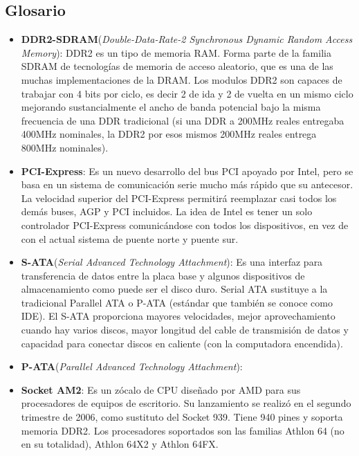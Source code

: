 \subsection{Glosario}

\begin{itemize}
\item \textbf{DDR2-SDRAM}(\textit{Double-Data-Rate-2 Synchronous Dynamic Random Access
Memory}): DDR2 es un tipo de memoria RAM. Forma parte de la familia SDRAM de
tecnologías de memoria de acceso aleatorio, que es una de las muchas
implementaciones de la DRAM. Los modulos DDR2 son capaces de trabajar con 4 bits
por ciclo, es decir 2 de ida y 2 de vuelta en un mismo ciclo mejorando
sustancialmente el ancho de banda potencial bajo la misma frecuencia de una DDR
tradicional (si una DDR a 200MHz reales entregaba 400MHz nominales, la DDR2 por
esos mismos 200MHz reales entrega 800MHz nominales).

\item \textbf{PCI-Express}: Es un nuevo desarrollo del bus PCI apoyado por
Intel, pero se basa en un sistema de comunicación serie mucho más rápido que su
antecesor. La velocidad superior del PCI-Express permitirá reemplazar casi todos
los demás buses, AGP y PCI incluidos. La idea de Intel es tener un solo
controlador PCI-Express comunicándose con todos los dispositivos, en vez de con
el actual sistema de puente norte y puente sur.

\item \textbf{S-ATA}(\textit{Serial Advanced Technology Attachment}): Es una interfaz
para transferencia de datos entre la placa base y algunos dispositivos de
almacenamiento como puede ser el disco duro. Serial ATA sustituye a la
tradicional Parallel ATA o P-ATA (estándar que también se conoce como IDE). El
S-ATA proporciona mayores velocidades, mejor aprovechamiento cuando hay varios
discos, mayor longitud del cable de transmisión de datos y capacidad para
conectar discos en caliente (con la computadora encendida).

\item \textbf{P-ATA}(\textit{Parallel Advanced Technology Attachment}):

\item \textbf{Socket AM2}: Es un zócalo de CPU diseñado por AMD para sus
procesadores de equipos de escritorio. Su lanzamiento se realizó en el segundo
trimestre de 2006, como sustituto del Socket 939. Tiene 940 pines y soporta
memoria DDR2. Los procesadores soportados son las familias Athlon 64 (no en su totalidad), Athlon 64X2
y Athlon 64FX.
\end{itemize}
